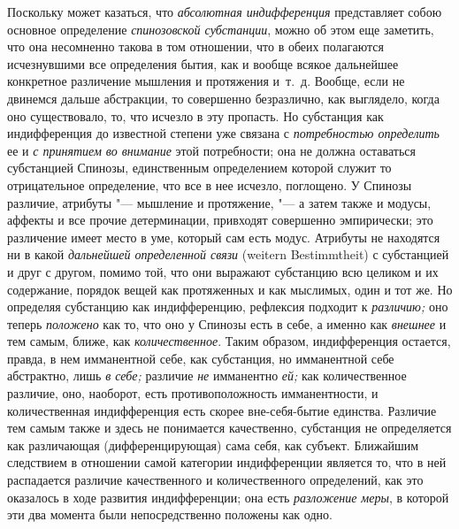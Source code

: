 Поскольку может казаться, что {\em абсолютная индифференция} представляет собою
основное определение {\em спинозовской субстанции}, можно об этом еще заметить,
что она несомненно такова в том отношении, что в обеих полагаются исчезнувшими
все определения бытия, как и вообще всякое дальнейшее конкретное различение
мышления и протяжения и~т.~д. Вообще, если не двинемся дальше абстракции, то
совершенно безразлично, как выглядело, когда оно существовало, то, что исчезло
в эту пропасть. Но субстанция как индифференция до известной степени уже
связана с {\em потребностью определить} ее и {\em с принятием во внимание} этой
потребности; она не должна оставаться субстанцией Спинозы, единственным
определением которой служит то отрицательное определение, что все в нее
исчезло, поглощено. У Спинозы
различие, атрибуты "--- мышление и протяжение, "--- а затем также и модусы,
аффекты и все прочие детерминации, привходят совершенно эмпирически; это
различение имеет место в уме, который сам есть модус. Атрибуты не находятся ни
в какой {\em дальнейшей определенной связи} (weitern Bestimmtheit) с
субстанцией и друг с другом, помимо той, что они выражают субстанцию всю
целиком и их содержание, порядок вещей как протяженных и как мыслимых, один и
тот же. Но определяя субстанцию как индифференцию, рефлексия подходит к
{\em различию;} оно теперь {\em положено} как то, что оно у Спинозы есть в
себе, а именно как {\em внешнее} и тем самым, ближе, как {\em количественное}.
Таким образом, индифференция остается, правда, в нем имманентной себе, как
субстанция, но имманентной себе абстрактно, лишь {\em в себе;} различие
{\em не} имманентно {\em ей;} как количественное различие, оно, наоборот, есть
противоположность имманентности, и количественная индифференция есть скорее
вне-себя-бытие единства. Различие тем самым также и здесь не понимается
качественно, субстанция не определяется как различающая (дифференцирующая) сама
себя, как субъект. Ближайшим следствием в отношении самой категории
индифференции является то, что в ней распадается различие качественного и
количественного определений, как это оказалось в ходе развития индифференции;
она есть {\em разложение меры}, в которой эти два момента были непосредственно
положены как одно.

